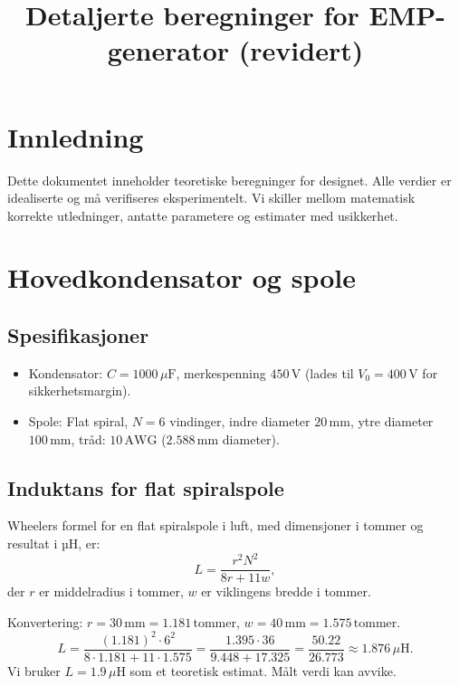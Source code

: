 \documentclass{article}
\title{Detaljerte beregninger for EMP-generator (revidert)}
\author{}
\date{}
\begin{document}
\maketitle

\section{Innledning}
Dette dokumentet inneholder teoretiske beregninger for designet. Alle verdier er idealiserte og må verifiseres eksperimentelt. Vi skiller mellom matematisk korrekte utledninger, antatte parametere og estimater med usikkerhet.

\section{Hovedkondensator og spole}

\subsection{Spesifikasjoner}
\begin{itemize}
\item Kondensator: $C = 1000\,\mu\text{F}$, merkespenning $450\,\text{V}$ (lades til $V_0 = 400\,\text{V}$ for sikkerhetsmargin).
\item Spole: Flat spiral, $N = 6$ vindinger, indre diameter $20\,\text{mm}$, ytre diameter $100\,\text{mm}$, tråd: $10\,\text{AWG}$ ($2.588\,\text{mm}$ diameter).
\end{itemize}

\subsection{Induktans for flat spiralspole}
Wheelers formel for en flat spiralspole i luft, med dimensjoner i tommer og resultat i µH, er:
\begin{equation}
L = \frac{r^2 N^2}{8r + 11w},
\end{equation}
der $r$ er middelradius i tommer, $w$ er viklingens bredde i tommer.

Konvertering: $r = 30\,\text{mm} = 1.181\,\text{tommer}$, $w = 40\,\text{mm} = 1.575\,\text{tommer}$.
\begin{equation}
L = \frac{(1.181)^2 \cdot 6^2}{8 \cdot 1.181 + 11 \cdot 1.575} = \frac{1.395 \cdot 36}{9.448 + 17.325} = \frac{50.22}{26.773} \approx 1.876\,\mu\text{H}.
\end{equation}
Vi bruker $L = 1.9\,\mu\text{H}$ som et teoretisk estimat. Målt verdi kan avvike.
\end{document}
